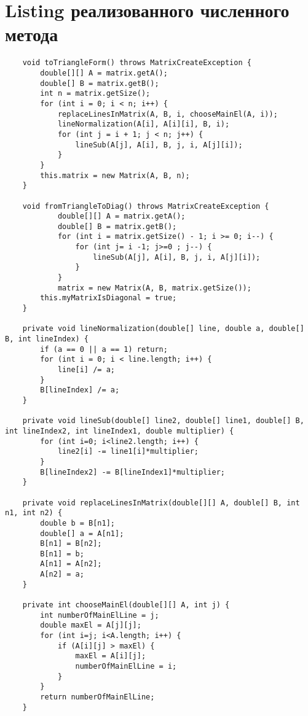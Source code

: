\section{Listing реализованного численного метода}
\tiny
\begin{verbatim}
    void toTriangleForm() throws MatrixCreateException {
        double[][] A = matrix.getA();
        double[] B = matrix.getB();
        int n = matrix.getSize();
        for (int i = 0; i < n; i++) {
            replaceLinesInMatrix(A, B, i, chooseMainEl(A, i));
            lineNormalization(A[i], A[i][i], B, i);
            for (int j = i + 1; j < n; j++) {
                lineSub(A[j], A[i], B, j, i, A[j][i]);
            }
        }
        this.matrix = new Matrix(A, B, n);
    }

    void fromTriangleToDiag() throws MatrixCreateException {
            double[][] A = matrix.getA();
            double[] B = matrix.getB();
            for (int i = matrix.getSize() - 1; i >= 0; i--) {
                for (int j= i -1; j>=0 ; j--) {
                    lineSub(A[j], A[i], B, j, i, A[j][i]);
                }
            }
            matrix = new Matrix(A, B, matrix.getSize());
        this.myMatrixIsDiagonal = true;
    }

    private void lineNormalization(double[] line, double a, double[] B, int lineIndex) {
        if (a == 0 || a == 1) return;
        for (int i = 0; i < line.length; i++) {
            line[i] /= a;
        }
        B[lineIndex] /= a;
    }

    private void lineSub(double[] line2, double[] line1, double[] B, int lineIndex2, int lineIndex1, double multiplier) {
        for (int i=0; i<line2.length; i++) {
            line2[i] -= line1[i]*multiplier;
        }
        B[lineIndex2] -= B[lineIndex1]*multiplier;
    }

    private void replaceLinesInMatrix(double[][] A, double[] B, int n1, int n2) {
        double b = B[n1];
        double[] a = A[n1];
        B[n1] = B[n2];
        B[n1] = b;
        A[n1] = A[n2];
        A[n2] = a;
    }

    private int chooseMainEl(double[][] A, int j) {
        int numberOfMainElLine = j;
        double maxEl = A[j][j];
        for (int i=j; i<A.length; i++) {
            if (A[i][j] > maxEl) {
                maxEl = A[i][j];
                numberOfMainElLine = i;
            }
        }
        return numberOfMainElLine;
    }
\end{verbatim}
\normalsize
\newpage
\thispagestyle{empty}
\BgThispage
